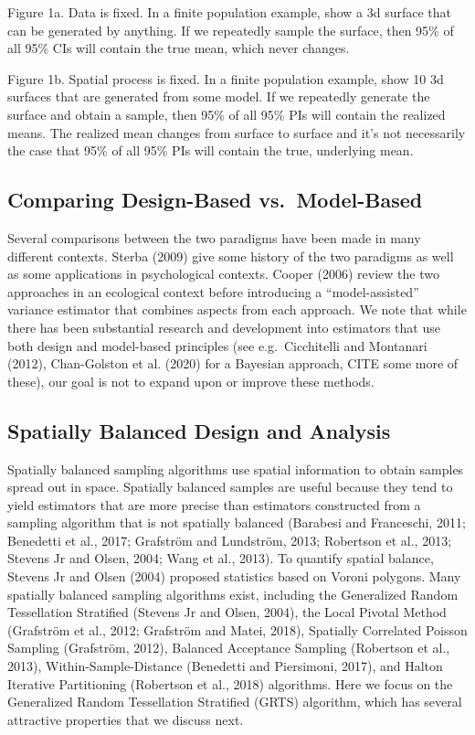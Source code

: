 \documentclass[]{elsarticle} %
\begin{document}
Figure 1a. Data is fixed. In a finite population example, show a 3d
surface that can be generated by anything. If we repeatedly sample the
surface, then 95\% of all 95\% CIs will contain the true mean, which
never changes.

Figure 1b. Spatial process is fixed. In a finite population example,
show 10 3d surfaces that are generated from some model. If we repeatedly
generate the surface and obtain a sample, then 95\% of all 95\% PIs will
contain the realized means. The realized mean changes from surface to
surface and it's not necessarily the case that 95\% of all 95\% PIs will
contain the true, underlying mean.

\hypertarget{comparing-design-based-vs.-model-based}{%
\subsection{Comparing Design-Based
vs.~Model-Based}\label{comparing-design-based-vs.-model-based}}

Several comparisons between the two paradigms have been made in many
different contexts. Sterba (2009) give some history of the two paradigms
as well as some applications in psychological contexts. Cooper (2006)
review the two approaches in an ecological context before introducing a
``model-assisted'' variance estimator that combines aspects from each
approach. We note that while there has been substantial research and
development into estimators that use both design and model-based
principles (see e.g.~Cicchitelli and Montanari (2012), Chan-Golston et
al. (2020) for a Bayesian approach, CITE some more of these), our goal
is not to expand upon or improve these methods.

\hypertarget{spatially-balanced-design-and-analysis}{%
\subsection{Spatially Balanced Design and
Analysis}\label{spatially-balanced-design-and-analysis}}

Spatially balanced sampling algorithms use spatial information to obtain
samples spread out in space. Spatially balanced samples are useful
because they tend to yield estimators that are more precise than
estimators constructed from a sampling algorithm that is not spatially
balanced (Barabesi and Franceschi, 2011; Benedetti et al., 2017;
Grafström and Lundström, 2013; Robertson et al., 2013; Stevens Jr and
Olsen, 2004; Wang et al., 2013). To quantify spatial balance, Stevens Jr
and Olsen (2004) proposed statistics based on Voroni polygons. Many
spatially balanced sampling algorithms exist, including the Generalized
Random Tessellation Stratified (Stevens Jr and Olsen, 2004), the Local
Pivotal Method (Grafström et al., 2012; Grafström and Matei, 2018),
Spatially Correlated Poisson Sampling (Grafström, 2012), Balanced
Acceptance Sampling (Robertson et al., 2013), Within-Sample-Distance
(Benedetti and Piersimoni, 2017), and Halton Iterative Partitioning
(Robertson et al., 2018) algorithms. Here we focus on the Generalized
Random Tessellation Stratified (GRTS) algorithm, which has several
attractive properties that we discuss next.
\end{document}
